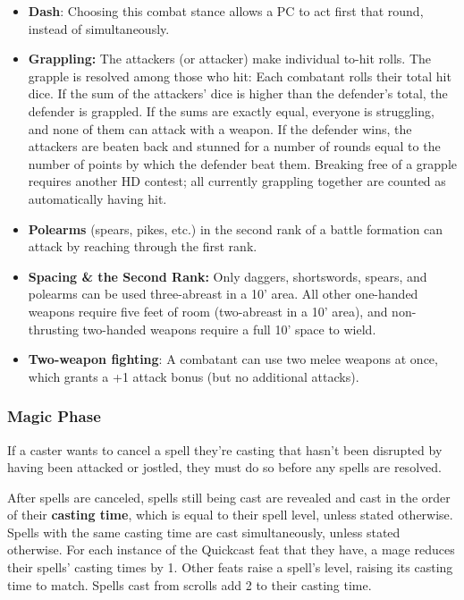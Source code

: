 \documentclass{article}
\begin{document}
\begin{multicols}{2}
\begin{itemize}
\tightlist
\item
  \textbf{Dash}: Choosing this combat stance allows a PC to act first
  that round, instead of simultaneously.
\item
  \textbf{Grappling:} The attackers (or attacker) make individual to-hit
  rolls. The grapple is resolved among those who hit: Each combatant
  rolls their total hit dice. If the sum of the attackers' dice is
  higher than the defender's total, the defender is grappled. If the
  sums are exactly equal, everyone is struggling, and none of them can
  attack with a weapon. If the defender wins, the attackers are beaten
  back and stunned for a number of rounds equal to the number of points
  by which the defender beat them. Breaking free of a grapple requires
  another HD contest; all currently grappling together are counted as
  automatically having hit.
\item
  \textbf{Polearms} (spears, pikes, etc.) in the second rank of a battle
  formation can attack by reaching through the first rank.
\item
  \textbf{Spacing \& the Second Rank:} Only daggers, shortswords,
  spears, and polearms can be used three-abreast in a 10' area. All
  other one-handed weapons require five feet of room (two-abreast in a
  10' area), and non-thrusting two-handed weapons require a full 10'
  space to wield.
\item
  \textbf{Two-weapon fighting}: A combatant can use two melee weapons at
  once, which grants a +1 attack bonus (but no additional attacks).
\end{itemize}

\subsubsection{Magic Phase}\label{magic-phase}

If a caster wants to cancel a spell they're casting that hasn't been
disrupted by having been attacked or jostled, they must do so before any
spells are resolved.

After spells are canceled, spells still being cast are revealed and cast
in the order of their \textbf{casting time}, which is equal to their
spell level, unless stated otherwise. Spells with the same casting time
are cast simultaneously, unless stated otherwise. For each instance of
the Quickcast feat that they have, a mage reduces their spells' casting
times by 1. Other feats raise a spell's level, raising its casting time
to match. Spells cast from scrolls add 2 to their casting time.


\end{multicols}
\end{document}
